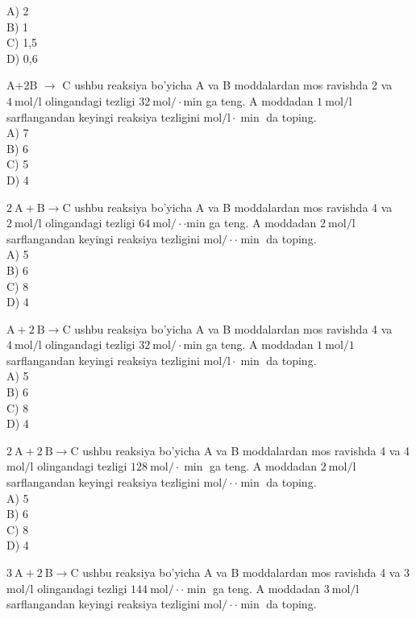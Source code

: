 A) 2\\
B) 1\\
C) 1,5\\
D) 0,6
  \item A+2B $\rightarrow$ C ushbu reaksiya bo'yicha A va B moddalardan mos ravishda 2 va $4 \mathrm{~mol} / \mathrm{l}$ olingandagi tezligi $32 \mathrm{~mol} / \cdot \mathrm{min}$ ga teng. A moddadan $1 \mathrm{~mol} / \mathrm{l}$ sarflangandan keyingi reaksiya tezligini $\mathrm{mol} / \mathrm{l} \cdot \min$ da toping.\\
A) 7\\
B) 6\\
C) 5\\
D) 4
  \item $2 \mathrm{~A}+\mathrm{B} \rightarrow \mathrm{C}$ ushbu reaksiya bo'yicha A va B moddalardan mos ravishda 4 va $2 \mathrm{~mol} / \mathrm{l}$ olingandagi tezligi $64 \mathrm{~mol} / \cdot \cdot \mathrm{min}$ ga teng. A moddadan $2 \mathrm{~mol} / \mathrm{l}$ sarflangandan keyingi reaksiya tezligini $\mathrm{mol} / \cdot \cdot \min$ da toping.\\
A) 5\\
B) 6\\
C) 8\\
D) 4
  \item $\mathrm{A}+2 \mathrm{~B} \rightarrow \mathrm{C}$ ushbu reaksiya bo'yicha A va B moddalardan mos ravishda 4 va $4 \mathrm{~mol} / \mathrm{l}$ olingandagi tezligi $32 \mathrm{~mol} / \cdot \mathrm{min}$ ga teng. A moddadan $1 \mathrm{~mol} / 1$ sarflangandan keyingi reaksiya tezligini $\mathrm{mol} / \mathrm{l} \cdot \min$ da toping.\\
A) 5\\
B) 6\\
C) 8\\
D) 4
  \item $2 \mathrm{~A}+2 \mathrm{~B} \rightarrow \mathrm{C}$ ushbu reaksiya bo'yicha A va B moddalardan mos ravishda 4 va 4 $\mathrm{mol} / \mathrm{l}$ olingandagi tezligi $128 \mathrm{~mol} / \cdot \min$ ga teng. A moddadan $2 \mathrm{~mol} / \mathrm{l}$ sarflangandan keyingi reaksiya tezligini $\mathrm{mol} / \cdot \cdot \min$ da toping.\\
A) 5\\
B) 6\\
C) 8\\
D) 4
  \item $3 \mathrm{~A}+2 \mathrm{~B} \rightarrow \mathrm{C}$ ushbu reaksiya bo'yicha A va B moddalardan mos ravishda 4 va 3 $\mathrm{mol} / \mathrm{l}$ olingandagi tezligi $144 \mathrm{~mol} / \cdot \cdot \min$ ga teng. A moddadan $3 \mathrm{~mol} / \mathrm{l}$ sarflangandan keyingi reaksiya tezligini $\mathrm{mol} / \cdot \cdot \min$ da toping.\\
